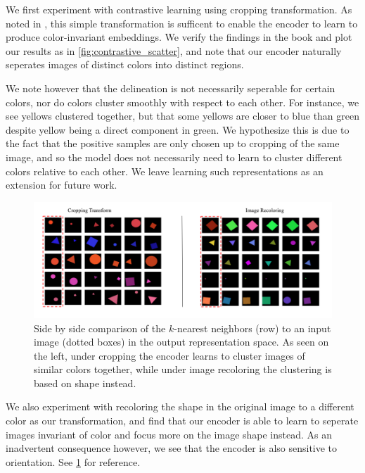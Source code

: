 \documentclass{article}
\begin{document}
  

We first experiment with contrastive learning using cropping transformation. As noted in \cite{foundationsCVbook}, this simple transformation is sufficent to enable the encoder to learn to produce color-invariant embeddings. We verify the findings in the book and plot our results as in \ref{fig:contrastive_scatter}, and note that our encoder naturally seperates images of distinct colors into distinct regions.

We note however that the delineation is not necessarily seperable for certain colors, nor do colors cluster smoothly with respect to each other. For instance, we see yellows clustered together, but that some yellows are closer to blue than green despite yellow being a direct component in green. We hypothesize this is due to the fact that the positive samples are only chosen up to cropping of the same image, and so the model does not necessarily need to learn to cluster different colors relative to each other. We leave learning such representations as an extension for future work. 


\begin{figure}[ht]
\centerline{\includegraphics[scale=0.45]{contrast_learning_transforms.png}}
\caption{Side by side comparison of the $k$-nearest neighbors (row) to an input image (dotted boxes) in the output representation space. As seen on the left, under cropping the encoder learns to cluster images of similar colors together, while under image recoloring the clustering is based on shape instead. }\label{fig:contrastive_transforms}
\end{figure}   

We also experiment with recoloring the shape in the original image to a different color as our transformation, and find that our encoder is able to learn to seperate images invariant of color and focus more on the image shape instead. As an inadvertent consequence however, we see that the encoder is also sensitive to orientation. See \ref{fig:contrastive_transforms} for reference.
\end{document}
